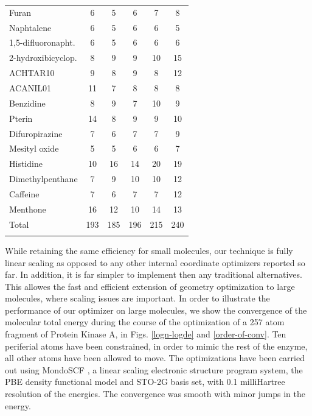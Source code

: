\documentclass[prl,aps,twocolumn,showpacs,twocolumngrid,superbib]{revtex4}
\begin{document}
\begin{table}[h]
\begin{tabular}{lccccc}
Furan                  &   6    &   5    &    6    &    7   &   8     \\
Naphtalene             &   6    &   5    &    6    &    6   &   5     \\
1,5-difluoronapht.     &   6    &   5    &    6    &    6   &   6     \\
2-hydroxibicyclop.     &   8    &   9    &    9    &   10   &  15     \\
ACHTAR10               &   9    &   8    &    9    &    8   &  12     \\
ACANIL01               &  11    &   7    &    8    &    8   &   8     \\
Benzidine              &   8    &   9    &    7    &   10   &   9     \\
Pterin                 &  14    &   8    &    9    &    9   &  10     \\
Difuropirazine         &   7    &   6    &    7    &    7   &   9     \\
Mesityl oxide          &   5    &   5    &    6    &    6   &   7     \\
Histidine              &  10    &  16    &   14    &   20   &  19     \\
Dimethylpenthane       &   7    &   9    &   10    &   10   &  12     \\
Caffeine               &   7    &   6    &    7    &    7   &  12     \\
Menthone               &  16    &  12    &   10    &   14   &  13     \\
\colrule
Total                  & 193    & 185    &  196    &  215   & 240     \\
\botrule
\end{tabular}
\end{table}

While retaining the same efficiency for small molecules, our technique
is fully linear scaling as opposed to any other internal 
coordinate optimizers reported so far. In addition, it is far simpler
to implement then any traditional alternatives.
This allowes the fast and efficient 
extension of geometry optimization 
to large molecules, where scaling issues are important.
In order to illustrate the performance of our optimizer on large
molecules, we show the convergence of the molecular total energy
during the course of the optimization of a 257 atom
fragment of Protein Kinase A, in Figs. \ref{logn-logde} 
and \ref{order-of-conv}. Ten periferial atoms have been 
constrained, in order to mimic the rest of the enzyme, 
all other atoms have been allowed to move.
The optimizations have been carried out 
using MondoSCF \cite{MondoSCF}, a linear scaling electronic structure
program system, the PBE density functional model and 
STO-2G basis set, with 0.1 milliHartree resolution of the energies.
The convergence was smooth with minor jumps in the energy.
\end{document}
